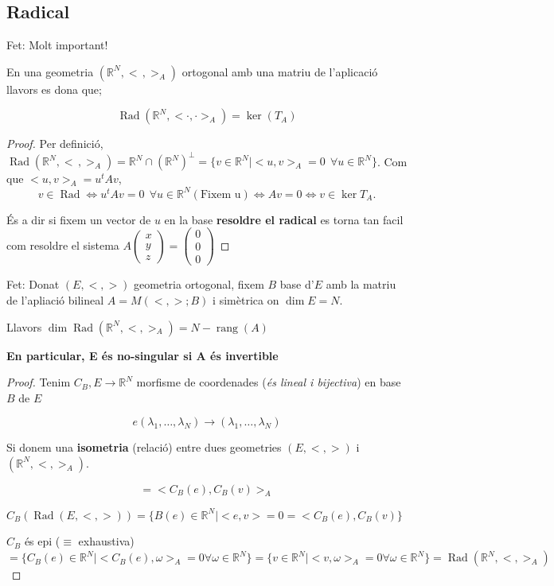 \documentclass[12pt]{article}
\newcommand{\R}{\mathbb{R}}
\begin{document}
\subsection{Radical}

\noindent Fet: Molt important!

En una geometria $(\R^N, <\,,>_A)$ ortogonal amb una matriu de l'aplicació llavors es dona que;

\[\boxed{\operatorname{Rad}(\R^N, <\cdot,\cdot>_A) = \ker(T_A)}\]

\begin{proof}
    Per definició, $\operatorname{Rad}(\R^N,<\,,>_A)=\R^N\cap(\R^N)^{\perp}=\{v\in\R^N \mid < u,v>_A=0\ \ \forall u\in\R^N\}$.
    Com que $< u,v>_A=u^tAv$,
    \[
    v\in\operatorname{Rad} \iff u^tAv=0\ \ \forall u\in\R^N (\text{Fixem u}) \iff Av=0 \iff v\in\ker T_A .
    \]

    És a dir si fixem un vector de $u$ en la base \textbf{resoldre el radical} es torna tan facil com resoldre el sistema $A \begin{pmatrix}
        x\\
        y\\
        z
    \end{pmatrix} = \begin{pmatrix}
        0\\
        0\\
        0
    \end{pmatrix}$

\end{proof}

\noindent Fet: Donat $(E, <,>)$ geometria ortogonal, fixem $B$ base d'$E$ amb la matriu de l'apliació bilineal $A = M(<,>; B)$ i simètrica on $\dim E = N$.

Llavors $\dim \operatorname{Rad} (\R^N, <,>_A) = N - \operatorname{rang}(A)$

\textbf{En particular, E és no-singular si A és invertible}

\begin{proof}
    Tenim $C_B, E \rightarrow \R^N$ morfisme de coordenades (\textit{és lineal i bijectiva}) en base $B$ de $E$

    \[e(\lambda_1, \dots,\lambda_N) \rightarrow (\lambda_1, \dots,\lambda_N)\] 

    Si donem una \textbf{isometria} (relació) entre dues geometries $(E, <,>)$ i $(\R^N, <,>_A)$.

    \[<e,v> = <C_B(e), C_B(v)>_A\]

    $C_B (\operatorname{Rad}(E,<,>))= \{B(e)\in \R^N \mid <e,v> = 0 = <C_B(e),C_B(v)\}$

    $C_B$ és epi ($\equiv$ exhaustiva) $= \{C_B(e)\in \R^N \mid <C_B(e), \omega>_A = 0 \forall \omega \in \R^N\} = \{v\in \R^N \mid <v,\omega>_A = 0 \forall \omega \in \R^N \} = \operatorname{Rad}(\R^N, <,>_A)$
\end{proof}
\end{document}
